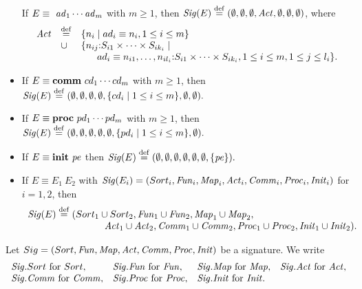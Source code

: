\documentclass[fleqn,a4paper,dvips]{article}
\newcommand{\Sig}{\nm{Sig}}
\newcommand{\Fun}{\nm{Fun}}
\newcommand{\wor}{\stackrel{\mathrm{def}}{=}}
\begin{document}
\begin{defn}
\begin{itemize}
If $E\equiv
\mathsf{~}{\it ad}_1\cdots {\it ad}_m$ with $m\geq 1$,
then
$\Sig(E)\wor(\emptyset,\emptyset,\emptyset,\Act,
\emptyset,\emptyset,
\emptyset)$, where
\[\begin{array}{lll}
\Act&\wor&
\{n_{i}\mid ad_i\equiv
n_{i}, 1\leq i\leq m \}\\
&\cup&\{n_{ij}\ap S_{i1}\times\cdots\times S_{ik_i}\mid\\
&&~~~~~ad_i\equiv
n_{i1},\ldots,n_{il_i}\ap S_{i1}\times\cdots\times S_{ik_i}, 1\leq i\leq
m, 1\leq j\leq l_i\}.
\end{array}
\]
\item
If $E\equiv
\mathbf{comm}~cd_1\cdots cd_m$ with $m\geq 1$,
then
$\Sig(E)\wor(\emptyset,\emptyset,\emptyset,\emptyset,
\{cd_i\mid 1\leq
i\leq m\}, \emptyset,\emptyset).$
\item
If $E\equiv
\mathbf{proc}~pd_1\cdots pd_m$ with $m\geq 1$,
then
$\Sig(E)\wor(\emptyset,\emptyset,\emptyset,\emptyset,\emptyset,
\{pd_i\mid 1\leq i\leq m\},\emptyset).$
\item
If $E\equiv
\mathbf{init}~{\it pe}$ then $\Sig(E)\wor(\emptyset,\emptyset,\emptyset,\emptyset,\emptyset,
\emptyset,\{\pe\}).$
\item
If $E\equiv E_1~E_2$
with $\Sig(E_i)=(Sort_{i},\Fun_{i},\Map_i,
\Act_{i},\Comm_{i},\Proc_{i},\Init_i)$ for $i=1,2$, then
\[\begin{array}{l}
\Sig(E)\wor(Sort_{1}\cup Sort_{2},\Fun_{1}\cup \Fun_{2},
\Map_1\cup\Map_2,\\
\hspace{8em}\Act_{1}\cup \Act_{2},\Comm_{1}\cup \Comm_{2},\Proc_{1}\cup
\Proc_{2},
\Init_1\cup\Init_2).
\end{array}\]
\end{itemize}
\end{defn}
\begin{defn}
Let $Sig=(Sort,\Fun,\Map,\Act,\Comm,\Proc,\Init)$ be a signature. We write
\[\begin{array}{llll}
\Sig.Sort~\mbox{for}~Sort,&
\Sig.\Fun~\mbox{for}~\Fun,&
\Sig.\Map~{\rm for}~\Map,&
\Sig.\Act~\mbox{for}~\Act,\\
\Sig.\Comm~\mbox{for}~\Comm,&
\Sig.\Proc~\mbox{for}~\Proc,&
\Sig.\Init~\mbox{for}~\Init.
\end{array}\]
\end{defn}
\end{document}
